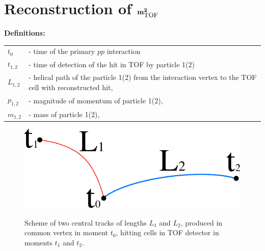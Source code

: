 
\chapter{Reconstruction of \texorpdfstring{$\bf{m}^{2}_{\text{\small TOF}}$}{mTOF^2}}\label{appendix:totalRpEffFormulation}


\textbf{Definitions:}\\[7pt]
\begin{tabular}{ll}
$t_{0}$ &- time of the primary $pp$ interaction\\
$t_{1,2}$ &- time of detection of the hit in TOF by particle 1(2)\\
$L_{1,2}$ & - helical path of the particle 1(2) from the interaction vertex to the TOF cell with reconstructed hit,\\
$p_{1,2}$ & - magnitude of momentum of particle 1(2),\\
$m_{1,2}$ & - mass of particle 1(2),\\
\end{tabular}\vspace{10pt}


\begin{figure}[ht!]
\centering%
\parbox{0.29\textwidth}{%
  \centering%
  \includegraphics[width=\linewidth]{graphics/eventSelection/TofScheme.pdf}\label{fig:tofScheme}
}%
\quad\quad%
\parbox{0.655\textwidth}{%
    \caption[Scheme of two central tracks with common vertex, hitting cells in TOF detector.]{Scheme of two central tracks of lengths $L_{1}$ and $L_{2}$, produced in common vertex in moment $t_{0}$, hitting cells in TOF detector in moments $t_{1}$ and $t_{2}$.}
}%

\end{figure}


